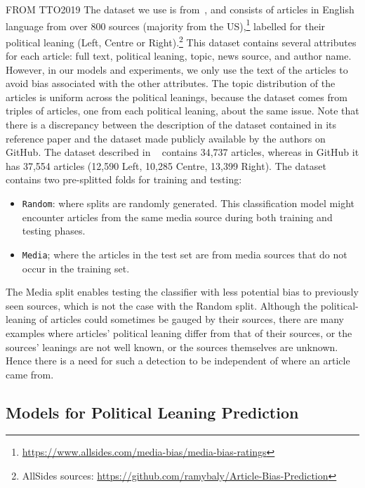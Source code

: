 FROM TTO2019
The dataset we use is from~\citet{baly2020we}, and consists of articles in English language from over 800 sources (majority from the US),\footnote{\url{https://www.allsides.com/media-bias/media-bias-ratings}} labelled for their political leaning (Left, Centre or Right).\footnote{AllSides sources: \url{https://github.com/ramybaly/Article-Bias-Prediction}}
This dataset contains several attributes for each article: full text, political leaning, topic, news source, and author name. However, in our models and experiments, we only use the text of the articles to avoid bias associated with the other attributes.
The topic distribution of the articles is uniform across the political leanings, because the dataset comes from triples of articles, one from each political leaning, about the same issue. 
Note that there is a discrepancy between the description of the dataset contained in its reference paper and the dataset made publicly available by the authors on GitHub.
The dataset described in ~\citet{baly2020we} contains 34,737 articles, whereas in GitHub it has 37,554 articles (12,590 Left, 10,285 Centre, 13,399 Right).
The dataset contains two pre-splitted folds for training and testing:
\begin{itemize}
    \item \texttt{Random}: where splits are randomly generated. This classification model might encounter articles from the same media source during both training and testing phases. 
    \item \texttt{Media}; where the articles in the test set are from media sources that do not occur in the training set. %
\end{itemize}

The Media split enables testing the classifier with less potential bias to previously seen sources, which is not the case with the Random split. Although the political-leaning of articles could sometimes be gauged by their sources, there are many examples where articles' political leaning differ from that of their sources, or the sources' leanings are not well known, or the sources themselves are unknown. Hence there is a need for such a detection to be independent of where an article came from.      

\subsection{Models for Political Leaning Prediction}
\label{ssec:ps_leaning_models}

